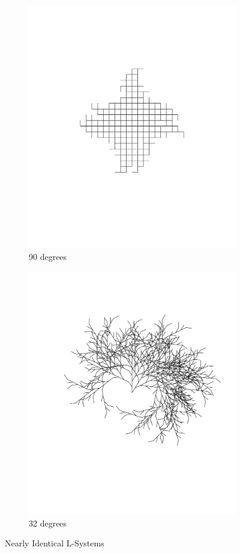 \documentclass[12pt,twoside]{reedthesis}
\begin{document}

	\begin{figure}[H]
	\begin{subfigure}{0.5\textwidth}
		\centering
		\includegraphics[clip=true, viewport=1.35in 3.5in 9.35in 9in, height=0.8\textwidth]{Images/Motivations1A}
		\caption[90 degrees]{90 degrees\footnotemark}
		\label {Motivations1A}
	\end{subfigure}
	\begin{subfigure}{0.5\textwidth}
		\centering
		\includegraphics[clip=true, viewport=1in 3.3in 9in 10in, height=0.8\textwidth]{Images/Motivations1B}
		\caption[32 degrees]{32 degrees\footnotemark}	
		\label {Motivations1B}
	\end{subfigure}
	\caption[Nearly Identical L-Systems]{Nearly Identical L-Systems}
	\label{Same}
	\end{figure}
	
\end{document}
